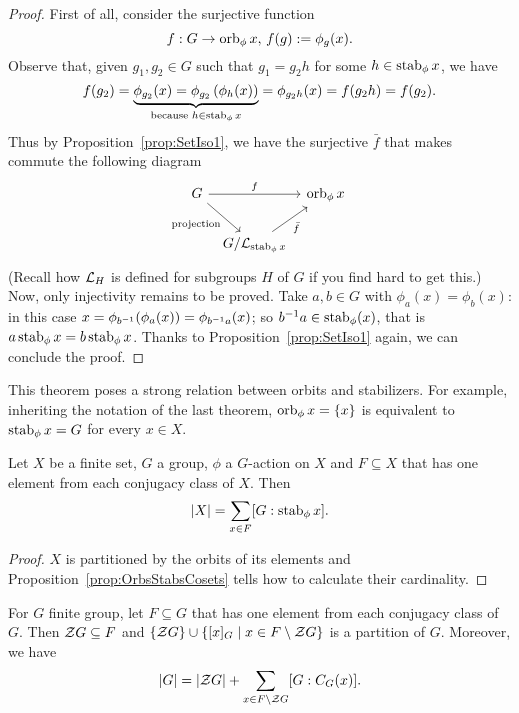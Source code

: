 \begin{proof}
First of all, consider the surjective function
\[f : G 	\to \operatorname{orb}_\phi x,\, f(g) := \phi_g(x) .\]
Observe that, given \(g_1, g_2 \in G\) such that \(g_1 = g_2 h\) for some \(h \in \operatorname{stab}_\phi x\), we have
\[f(g_2) = \underbrace{\phi_{g_2} (x) = \phi_{g_2} \left(\phi_h (x)\right)}_{\text{because } h \in \operatorname{stab}_\phi x} = \phi_{g_2h} (x) = f(g_2 h) = f(g_2) .\]
Thus by Proposition~\ref{prop:SetIso1}, we have the surjective \(\bar f\) that makes commute the following diagram
\[\begin{tikzcd}[column sep=tiny]
G \ar["{\text{projection}}", dr, swap] \ar["f", rr] & & \orb_\phi x \\
 & G{/}{\call_{\stab_\phi x}} \ar["{\bar f}", ur, swap]
\end{tikzcd}\]
(Recall how \(\mathcal L_H\) is defined for subgroups \(H\) of \(G\) if you find hard to get this.) Now, only injectivity remains to be proved. Take \(a, b \in G\) with \(\phi_a (x) = \phi_b (x)\): in this case \(x = \phi_{b^{-1}} (\phi_a (x)) = \phi_{b^{-1} a} (x)\); so \(b^{-1} a \in \operatorname{stab}_\phi (x)\), that is \(a \operatorname{stab}_\phi x = b \operatorname{stab}_\phi x\). Thanks to Proposition~\ref{prop:SetIso1} again, we can conclude the proof.
\end{proof}

This theorem poses a strong relation between orbits and stabilizers. For example, inheriting the notation of the last theorem, \(\operatorname{orb}_\phi x = \left\{x\right\}\) is equivalent to \(\operatorname{stab}_\phi x = G\) for every \(x \in X\).

\begin{proposition}\label{prop:ClassFormulaForSets}
Let \(X\) be a finite set, \(G\) a group, \(\phi\) a \(G\)-action on \(X\) and \(F \subseteq X\) that has one element from each conjugacy class of \(X\). Then
\[\left\lvert X\right\rvert = \sum_{x \in F} [G : \operatorname{stab}_\phi x] .\]
\end{proposition}

\begin{proof}
\(X\) is partitioned by the orbits of its elements and Proposition~\ref{prop:OrbsStabsCosets} tells how to calculate their cardinality.
\end{proof}

\begin{proposition}\label{prop:ClassFormulaForGroups}
For \(G\) finite group, let \(F \subseteq G\) that has one element from each conjugacy class of \(G\). Then \(\mathcal Z G \subseteq F\) and \(\left\{\mathcal Z G\right\} \cup \left\{[x]_G \mid x \in F \setminus \mathcal Z G\right\}\) is a partition of \(G\). Moreover, we have
\begin{equation}\left\lvert G\right\rvert = \left\lvert\mathcal Z G\right\rvert + \sum_{x \in F \setminus \mathcal Z G} [G:C_G(x)] .\label{eqn:ClassForm}\end{equation}
\end{proposition}

